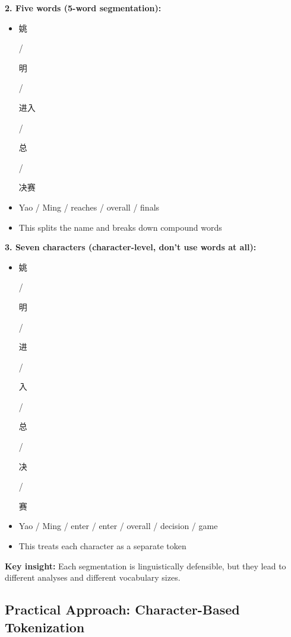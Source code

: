 \documentclass[11pt,a4paper]{article}
\theoremstyle{definition}
\theoremstyle{plain}
\theoremstyle{remark}
\begin{document}
\textbf{2. Five words (5-word segmentation):}
\begin{itemize}
    \item \begin{CJK}{UTF8}{gbsn}姚\end{CJK} / \begin{CJK}{UTF8}{gbsn}明\end{CJK} / \begin{CJK}{UTF8}{gbsn}进入\end{CJK} / \begin{CJK}{UTF8}{gbsn}总\end{CJK} / \begin{CJK}{UTF8}{gbsn}决赛\end{CJK}
    \item Yao / Ming / reaches / overall / finals
    \item This splits the name and breaks down compound words
\end{itemize}

\textbf{3. Seven characters (character-level, don't use words at all):}
\begin{itemize}
    \item \begin{CJK}{UTF8}{gbsn}姚\end{CJK} / \begin{CJK}{UTF8}{gbsn}明\end{CJK} / \begin{CJK}{UTF8}{gbsn}进\end{CJK} / \begin{CJK}{UTF8}{gbsn}入\end{CJK} / \begin{CJK}{UTF8}{gbsn}总\end{CJK} / \begin{CJK}{UTF8}{gbsn}决\end{CJK} / \begin{CJK}{UTF8}{gbsn}赛\end{CJK}
    \item Yao / Ming / enter / enter / overall / decision / game
    \item This treats each character as a separate token
\end{itemize}

\textbf{Key insight:} Each segmentation is linguistically defensible, but they lead to different analyses and different vocabulary sizes.

\subsection{Practical Approach: Character-Based Tokenization}
\end{document}
